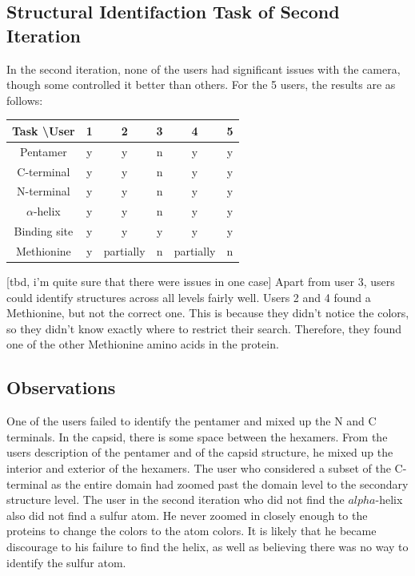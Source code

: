 \documentclass[review,journal]{vgtc}         %
\begin{document}
\subsection{Structural Identifaction Task of Second Iteration}
In the second iteration, none of the users had significant issues with the camera, though some controlled it better than others.
For the 5 users, the results are as follows:

\begin{tabular}{| c | c | c | c | c | c |}
	\hline
	Task \textbackslash User & 1 & 2 & 3 & 4 & 5 \\
	\hline
	Pentamer       & y & y & n & y & y\\
	\hline
	C-terminal     & y & y & n & y & y \\
	\hline
	N-terminal     & y & y & n & y & y  \\
	\hline
	$\alpha$-helix & y & y & n & y & y \\
	\hline
	Binding site   & y & y & y & y & y \\
	\hline
	Methionine      & y & partially & n & partially & n  \\
	\hline
\end{tabular}
[tbd, i'm quite sure that there were issues in one case]
Apart from user 3, users could identify structures across all levels fairly well. 
Users 2 and 4 found a Methionine, but not the correct one. 
This is because they didn't notice the colors, so they didn't know exactly where to restrict their search.
Therefore, they found one of the other Methionine amino acids in the protein.


\subsection{Observations}
One of the users failed to identify the pentamer and mixed up the N and C terminals. 
In the capsid, there is some space between the hexamers. 
From the users description of the pentamer and of the capsid structure, he mixed up the interior and exterior of the hexamers. 
The user who considered a subset of the C-terminal as the entire domain had zoomed past the domain level to the secondary structure level.
The user in the second iteration who did not find the $alpha$-helix also did not find a sulfur atom. He never zoomed in closely enough to the proteins to change the colors to the atom colors. It is likely that he became discourage to his failure to find the helix, as well as believing there was no way to identify the sulfur atom.
\end{document}
